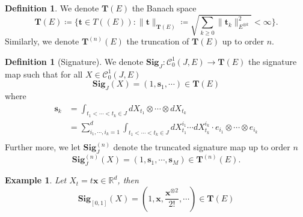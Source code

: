 \documentclass[12pt]{report}
\newtheorem{example}[theorem]{Example}
\theoremstyle{definition}
\newtheorem{definition}[theorem]{Definition}
\theoremstyle{remark}
\newcommand{\R}{\mathbb{R}}
\begin{document}
\begin{definition}
  We denote $\mathbf{T}(E)$ the Banach space 
  \begin{equation}
    \mathbf{T}(E) \coloneq \bigg\{\mathbf{t} \in T((E)) \colon \lVert \mathbf{t}\rVert_{\mathbf{T}(E)} \coloneq \sqrt{\sum_{k\geq 0}\lVert \mathbf{t}_{k}\rVert_{E^{\otimes k}}^{2} } < \infty \bigg\}.
  \end{equation} 
  Similarly, we denote $\mathbf{T}^{(n)}(E)$ the truncation of $\mathbf{T}(E)$ up to order $n$.
\end{definition}

\begin{definition}[Signature]
  We denote $\mathbf{Sig}_{J} \colon \mathcal{C}^{1}_{0}(J,E) \to \mathbf{T}(E)$ the signature map such that for all $X \in \mathcal{C}^{1}_{0}(J,E)$
  \begin{equation}
    \mathbf{Sig}_{J}(X) = (1, \mathbf{s}_{1},\cdots) \in \mathbf{T}(E)
  \end{equation}
  where 
  \begin{equation}
    \begin{split}
      \mathbf{s}_{k} &= \int_{t_{1}<\cdots< t_{k} \in J}dX_{t_{1}}\otimes\cdots\otimes dX_{t_{k}}\\
      &= \sum_{i_{1},\cdots,i_{k} = 1}^{d} \int_{t_{1}<\cdots< t_{k} \in J}dX_{t_{1}}^{i_{1}}\cdots dX_{t_{k}}^{i_{k}} \cdot e_{i_{1}}\otimes\cdots\otimes e_{i_{k}} \\
    \end{split}
  \end{equation}
  Further more, we let $\mathbf{Sig}^{(n)}_{J}$ denote the truncated signature map up to order $n$
  \begin{equation}
    \mathbf{Sig}^{(n)}_{J}(X) = (1, \mathbf{s}_{1},\cdots, \mathbf{s}_{M}) \in \mathbf{T}^{(n)}(E).
  \end{equation}
\end{definition}
\begin{example}\label{linear}
  Let $X_{t} = t\mathbf{x} \in \R^{d}$, then 
  \begin{equation}
    \mathbf{Sig}_{[0,1]}(X) = (1, \mathbf{x},\frac{\mathbf{x}^{\otimes 2}}{2!}, \cdots) \in \mathbf{T}(E)
  \end{equation}
\end{example}
\end{document}
